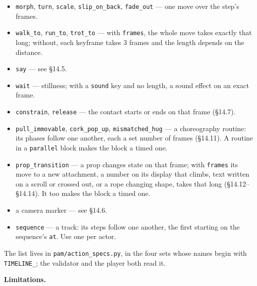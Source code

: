\documentclass[
  12pt,
  letterpaper,
]{book}
\begin{document}
\begin{itemize}
\item
  \texttt{morph}, \texttt{turn}, \texttt{scale},
  \texttt{slip\_on\_back}, \texttt{fade\_out} --- one move over the
  step's frames.
\item
  \texttt{walk\_to}, \texttt{run\_to}, \texttt{trot\_to} --- with
  \texttt{frames}, the whole move takes exactly that long; without,
  each keyframe takes 3 frames and the length depends on the distance.
\item
  \texttt{say} --- see \S14.5.
\item
  \texttt{wait} --- stillness; with a \texttt{sound} key and no length,
  a sound effect on an exact frame.
\item
  \texttt{constrain}, \texttt{release} --- the contact starts or ends
  on that frame (\S14.7).
\item
  \texttt{pull\_immovable}, \texttt{cork\_pop\_up},
  \texttt{mismatched\_hug} --- a choreography routine: its phases
  follow one another, each a set number of frames (\S14.11). A routine
  in a \texttt{parallel} block makes the block a timed one.
\item
  \texttt{prop\_transition} --- a prop changes state on that frame;
  with \texttt{frames} its move to a new attachment, a number on its
  display that climbs, text written on a scroll or crossed out, or a
  rope changing shape, takes that long (\S14.12--\S14.14). It too
  makes the block a timed
  one.
\item
  a camera marker --- see \S14.6.
\item
  \texttt{sequence} --- a track: its steps follow one another, the
  first starting on the sequence's \texttt{at}. Use one per actor.
\end{itemize}

The list lives in \texttt{pam/action\_specs.py}, in the four sets
whose names begin with \texttt{TIMELINE\_}; the validator and the
player both read it.

\textbf{Limitations.}
\end{document}
